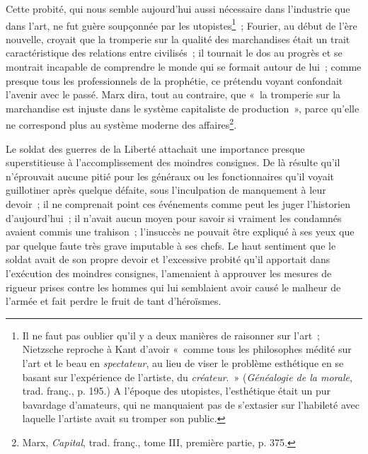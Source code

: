 \documentclass[french,twoside]{book} %
\begin{document}
Cette probité, qui nous semble aujourd’hui aussi nécessaire dans l’industrie que dans l’art, ne fut guère soupçonnée par les utopistes\footnote{ \noindent Il ne faut pas oublier qu’il y a deux manières de raisonner sur l’art ; Nietzsche reproche à Kant d’avoir « comme tous les philosophes médité sur l’art et le beau en \emph{spectateur}, au lieu de viser le problème esthétique en se basant sur l’expérience de l’artiste, du \emph{créateur}. » (\emph{Généalogie de la morale}, trad. franç., p. 195.) A l’époque des utopistes, l’esthétique était un pur bavardage d’amateurs, qui ne manquaient pas de s’extasier sur l’habileté avec laquelle l’artiste avait su tromper son public.
 } ; Fourier, au début de l’ère nouvelle, croyait que la tromperie sur la qualité des marchandises était un trait caractéristique des relations entre civilisés ; il tournait le dos au progrès et se montrait incapable de comprendre le monde qui se formait autour de lui ; comme presque tous les professionnels de la prophétie, ce prétendu voyant confondait l’avenir avec le passé. Marx dira, tout au contraire, que « la tromperie sur la marchandise est injuste dans le système capitaliste de production », parce qu’elle ne correspond plus au système moderne des affaires\footnote{ \noindent Marx, \emph{Capital}, trad. franç., tome III, première partie, p. 375.
 }.\par
Le soldat des guerres de la Liberté attachait une importance presque superstitieuse à l’accomplissement des moindres consignes. De là résulte qu’il n’éprouvait  aucune pitié pour les généraux ou les fonctionnaires qu’il voyait guillotiner après quelque défaite, sous l’inculpation de manquement à leur devoir ; il ne comprenait point ces événements comme peut les juger l’historien d’aujourd’hui ; il n’avait aucun moyen pour savoir si vraiment les condamnés avaient commis une trahison ; l’insuccès ne pouvait être expliqué à ses yeux que par quelque faute très grave imputable à ses chefs. Le haut sentiment que le soldat avait de son propre devoir et l’excessive probité qu’il apportait dans l’exécution des moindres consignes, l’amenaient à approuver les mesures de rigueur prises contre les hommes qui lui semblaient avoir causé le malheur de l’armée et fait perdre le fruit de tant d’héroïsmes.\par
\end{document}
